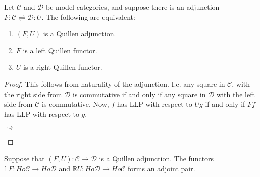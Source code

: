 \documentclass[../thesis.tex]{subfiles}
\begin{document}
            \begin{lemma}
                Let $\mathcal{C}$ and $\mathcal{D}$ be model categories, and suppose there is an adjunction $F:\mathcal{C}\rightleftharpoons\mathcal{D}:U$. The following are equivalent:
                \begin{enumerate}
                    \item $(F,U)$ is a Quillen adjunction.
                    \item $F$ is a left Quillen functor.
                    \item $U$ is a right Quillen functor.
                \end{enumerate}
            \end{lemma}

            \begin{proof}
                This follows from naturality of the adjunction. I.e. any square in $\mathcal{C}$, with the right side from $\mathcal{D}$ is commutative if and only if any square in $\mathcal{D}$ with the left side from $\mathcal{C}$ is commutative. Now, $f$ has LLP with respect to $Ug$ if and only if $Ff$ has LLP with respect to $g$.
                \begin{center}
                     $\rightsquigarrow$
                \end{center} 
            \end{proof}

            \begin{proposition}
                Suppose that $(F,U):\mathcal{C}\rightarrow\mathcal{D}$ is a Quillen adjunction. The functors $\mathbb{L}F:Ho\mathcal{C}\rightarrow Ho\mathcal{D}$ and $\mathbb{R}U: Ho\mathcal{D}\rightarrow Ho\mathcal{C}$ forms an adjoint pair.
            \end{proposition}
\end{document}
